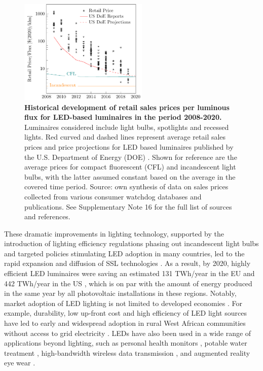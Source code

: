 \documentclass[parskip=full]{article}
\begin{document}
\begin{figure}[H]
\centering
  \includegraphics[height=5cm]{figures/cost_lamp_small.pdf}
  \caption{\textbf{Historical development of retail sales prices per luminous flux for LED-based luminaires in the period 2008-2020.} Luminaires considered include light bulbs, spotlights and recessed lights. Red curved and dashed lines represent average retail sales prices and price projections for LED based luminaires published by the U.S. Department of Energy (DOE) \cite{national2013assessment}. Shown for reference are the average prices for compact fluorescent (CFL) and incandescent light bulbs, with the latter assumed constant based on the average in the covered time period. Source: own synthesis of data on sales prices collected from various consumer watchdog databases and publications. See Supplementary Note 16 for the full list of sources and references.}
  \label{fgr:cost_lamp_small}
\end{figure}

These dramatic improvements in lighting technology, supported by the introduction of lighting efficiency regulations phasing out incandescent light bulbs and targeted policies stimulating LED adoption in many countries, led to the rapid expansion and diffusion of SSL technologies \cite{weinold2020long, stegmaier2021incandescent, Mills2014}. As a result, by 2020, highly efficient LED luminaires were saving an estimated 131 TWh/year in the EU \cite{eu2019impactass} and 442 TWh/year in the US \cite{guidehouse2020adoption}, which is on par with the amount of energy produced in the same year by all photovoltaic installations in these regions. Notably, market adoption of LED lighting is not limited to developed economies \cite{Kamat2020}. For example, durability, low up-front cost and high efficiency of LED light sources have led to early and widespread adoption in rural West African communities without access to grid electricity \cite{Bensch2017}. LEDs have also been used in a wide range of applications beyond lighting, such as personal health monitors \cite{Wyatt2020}, potable water treatment \cite{Lui2014}, high-bandwidth wireless data transmission \cite{Haas2016}, and augmented reality eye wear \cite{Lee2016}. 
\end{document}
